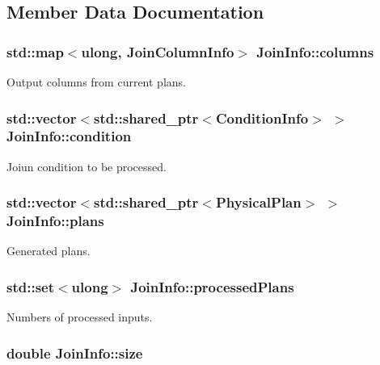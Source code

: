 \subsection{Member Data Documentation}
\hypertarget{class_join_info_a4890e0bbeaf9718d16765b8f408ec1b5}{
\subsubsection[{columns}]{\setlength{\rightskip}{0pt plus 5cm}std\+::map$<$ulong, {\bf Join\+Column\+Info}$>$ Join\+Info\+::columns}}\label{class_join_info_a4890e0bbeaf9718d16765b8f408ec1b5}
Output columns from current plans. \hypertarget{class_join_info_a0b9f3b02df4e768208f53c549e0b6e61}{
\subsubsection[{condition}]{\setlength{\rightskip}{0pt plus 5cm}std\+::vector$<$std\+::shared\+\_\+ptr$<${\bf Condition\+Info}$>$ $>$ Join\+Info\+::condition}}\label{class_join_info_a0b9f3b02df4e768208f53c549e0b6e61}
Joiun condition to be processed. \hypertarget{class_join_info_acbddcf9cd01e91396492b94a627bdf69}{
\subsubsection[{plans}]{\setlength{\rightskip}{0pt plus 5cm}std\+::vector$<$std\+::shared\+\_\+ptr$<${\bf Physical\+Plan}$>$ $>$ Join\+Info\+::plans}}\label{class_join_info_acbddcf9cd01e91396492b94a627bdf69}
Generated plans. \hypertarget{class_join_info_a584f1ea54151c8e0c506911a6595c7cb}{
\subsubsection[{processed\+Plans}]{\setlength{\rightskip}{0pt plus 5cm}std\+::set$<$ulong$>$ Join\+Info\+::processed\+Plans}}\label{class_join_info_a584f1ea54151c8e0c506911a6595c7cb}
Numbers of processed inputs. \hypertarget{class_join_info_a526146b07ef6d1bba7475f7998bf0588}{
\subsubsection[{size}]{\setlength{\rightskip}{0pt plus 5cm}double Join\+Info\+::size}}\label{class_join_info_a526146b07ef6d1bba7475f7998bf0588}
